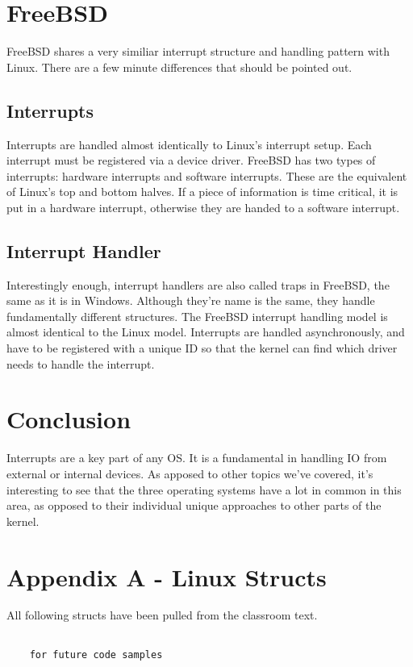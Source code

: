   \section{FreeBSD}
  FreeBSD shares a very similiar interrupt structure and handling pattern with
  Linux. There are a few minute differences that should be pointed out.
  \subsection{Interrupts}
  Interrupts are handled almost identically to Linux's interrupt setup. Each
  interrupt must be registered via a device driver. FreeBSD has two types of
  interrupts: hardware interrupts and software interrupts. These are the equivalent
  of Linux's top and bottom halves. If a piece of information is time critical,
  it is put in a hardware interrupt, otherwise they are handed to a software
  interrupt. \cite{freebsd2016}
  \subsection{Interrupt Handler}
  Interestingly enough, interrupt handlers are also called traps in FreeBSD, the
  same as it is in Windows. Although they're name is the same, they handle fundamentally
  different structures. The FreeBSD interrupt handling model is almost identical
  to the Linux model. Interrupts are handled asynchronously, and have to be registered
  with a unique ID so that the kernel can find which driver needs to handle the
  interrupt. \cite{freebsd2016}

  \section{Conclusion}

  Interrupts are a key part of any OS. It is a fundamental in handling IO from
  external or internal devices. As apposed to other topics we've covered, it's
  interesting to see that the three operating systems have a lot in common in this
  area, as opposed to their individual unique approaches to other parts of the
  kernel.

  \clearpage
  \section{Appendix A - Linux Structs}
  All following structs have been pulled from the classroom text. \cite{robertlove2010}
  \begin{lstlisting}

    for future code samples

  \end{lstlisting}


